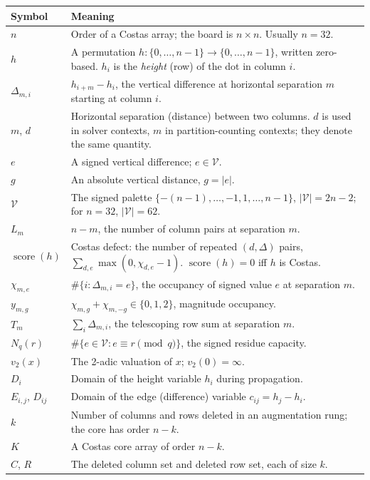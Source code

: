 \documentclass[11pt,a4paper]{article}
\theoremstyle{definition}
\newcommand{\score}{\operatorname{score}}
\newcommand{\vtwo}{v_2}
\begin{document}
\begin{longtable}{@{}l p{}@{}}
\toprule
Symbol & Meaning \\
\midrule
\endhead
$n$ & Order of a Costas array; the board is $n\times n$. Usually $n=32$. \\
$h$ & A permutation $h:\{0,\dots,n-1\}\to\{0,\dots,n-1\}$, written zero-based.
      $h_i$ is the \emph{height} (row) of the dot in column $i$. \\
$\Delta_{m,i}$ & $h_{i+m}-h_i$, the vertical difference at horizontal
      separation $m$ starting at column $i$. \\
$m$, $d$ & Horizontal separation (distance) between two columns. $d$ is used in
      solver contexts, $m$ in partition-counting contexts; they denote the same
      quantity. \\
$e$ & A signed vertical difference; $e\in\mathcal V$. \\
$g$ & An absolute vertical distance, $g=|e|$. \\
$\mathcal V$ & The signed palette $\{-(n-1),\dots,-1,1,\dots,n-1\}$,
      $|\mathcal V| = 2n-2$; for $n=32$, $|\mathcal V|=62$. \\
$L_m$ & $n-m$, the number of column pairs at separation $m$. \\
$\score(h)$ & Costas defect: the number of repeated $(d,\Delta)$ pairs,
      $\sum_{d,e}\max(0,\chi_{d,e}-1)$. $\score(h)=0$ iff $h$ is Costas. \\
$\chi_{m,e}$ & $\#\{i: \Delta_{m,i}=e\}$, the occupancy of signed value $e$
      at separation $m$. \\
$y_{m,g}$ & $\chi_{m,g}+\chi_{m,-g}\in\{0,1,2\}$, magnitude occupancy. \\
$T_m$ & $\sum_i \Delta_{m,i}$, the telescoping row sum at separation $m$. \\
$N_q(r)$ & $\#\{e\in\mathcal V : e\equiv r \pmod q\}$, the signed residue
      capacity. \\
$\vtwo(x)$ & The 2-adic valuation of $x$; $\vtwo(0)=\infty$. \\
$D_i$ & Domain of the height variable $h_i$ during propagation. \\
$E_{i,j}$, $D_{ij}$ & Domain of the edge (difference) variable $c_{ij}=h_j-h_i$. \\
$k$ & Number of columns and rows deleted in an augmentation rung; the core has
      order $n-k$. \\
$K$ & A Costas core array of order $n-k$. \\
$C$, $R$ & The deleted column set and deleted row set, each of size $k$. \\

\end{longtable}
\end{document}
